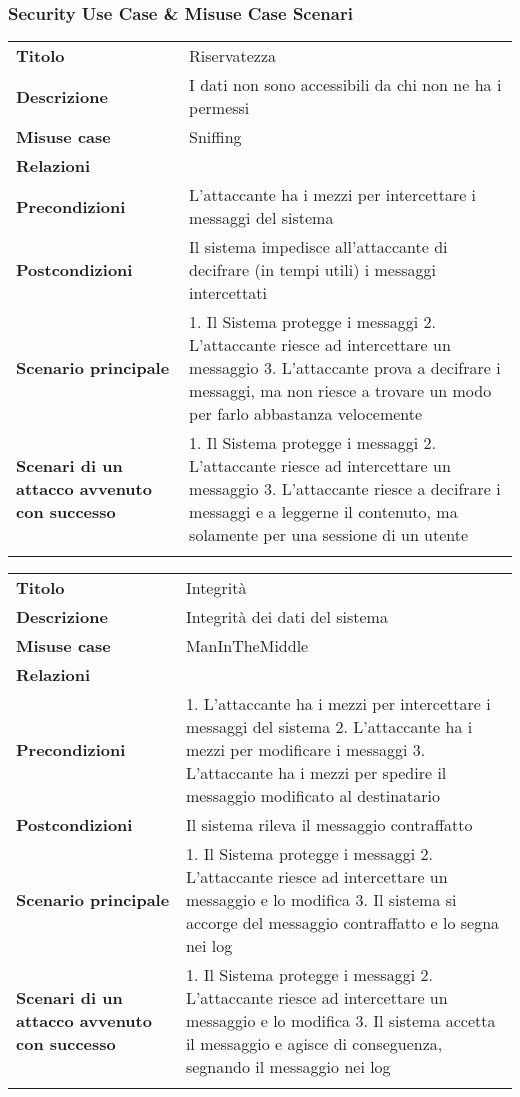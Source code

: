 \subsubsection{Security Use Case \& Misuse Case
Scenari}\label{security-use-case-misuse-case-scenari}

\begin{longtable}[c]{@{}ll@{}}
\toprule\addlinespace
\textbf{Titolo} & Riservatezza
\\\addlinespace
\textbf{Descrizione} & I dati non sono accessibili da chi non ne ha i
permessi
\\\addlinespace
\textbf{Misuse case} & Sniffing
\\\addlinespace
\textbf{Relazioni} &
\\\addlinespace
\textbf{Precondizioni} & L'attaccante ha i mezzi per intercettare i
messaggi del sistema
\\\addlinespace
\textbf{Postcondizioni} & Il sistema impedisce all'attaccante di
decifrare (in tempi utili) i messaggi intercettati
\\\addlinespace
\textbf{Scenario principale} & 1. Il Sistema protegge i messaggi 2.
L'attaccante riesce ad intercettare un messaggio 3. L'attaccante prova a
decifrare i messaggi, ma non riesce a trovare un modo per farlo
abbastanza velocemente
\\\addlinespace
\textbf{Scenari di un attacco avvenuto con successo} & 1. Il Sistema
protegge i messaggi 2. L'attaccante riesce ad intercettare un messaggio
3. L'attaccante riesce a decifrare i messaggi e a leggerne il contenuto,
ma solamente per una sessione di un utente
\\\addlinespace
\bottomrule
\end{longtable}

\begin{longtable}[c]{@{}ll@{}}
\toprule\addlinespace
\textbf{Titolo} & Integrità
\\\addlinespace
\textbf{Descrizione} & Integrità dei dati del sistema
\\\addlinespace
\textbf{Misuse case} & ManInTheMiddle
\\\addlinespace
\textbf{Relazioni} &
\\\addlinespace
\textbf{Precondizioni} & 1. L'attaccante ha i mezzi per intercettare i
messaggi del sistema 2. L'attaccante ha i mezzi per modificare i
messaggi 3. L'attaccante ha i mezzi per spedire il messaggio modificato
al destinatario
\\\addlinespace
\textbf{Postcondizioni} & Il sistema rileva il messaggio contraffatto
\\\addlinespace
\textbf{Scenario principale} & 1. Il Sistema protegge i messaggi 2.
L'attaccante riesce ad intercettare un messaggio e lo modifica 3. Il
sistema si accorge del messaggio contraffatto e lo segna nei log
\\\addlinespace
\textbf{Scenari di un attacco avvenuto con successo} & 1. Il Sistema
protegge i messaggi 2. L'attaccante riesce ad intercettare un messaggio
e lo modifica 3. Il sistema accetta il messaggio e agisce di
conseguenza, segnando il messaggio nei log
\\\addlinespace
\bottomrule
\end{longtable}

